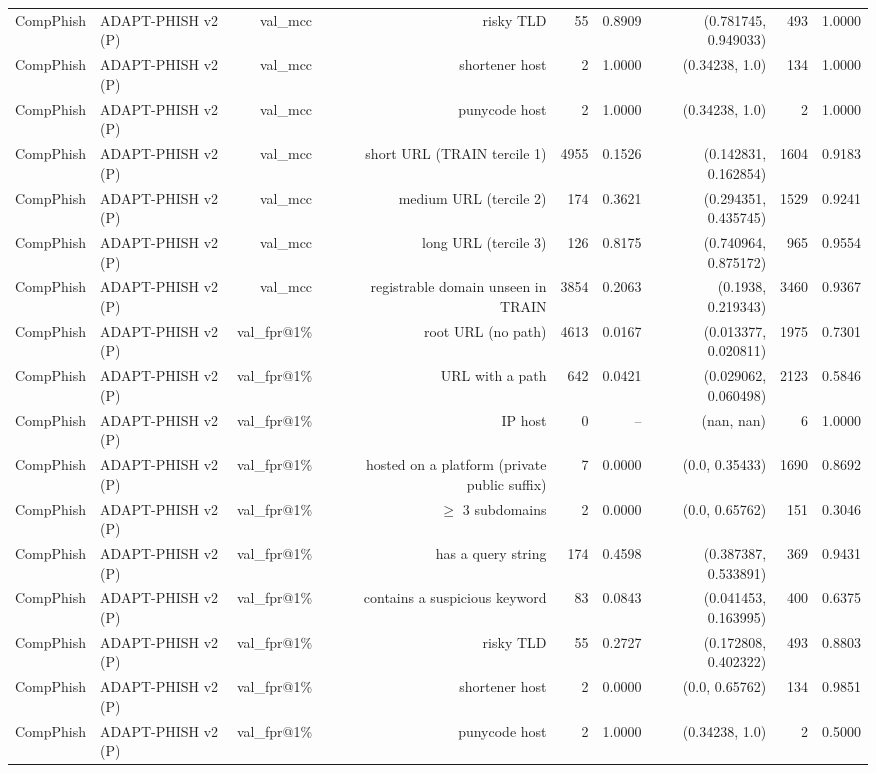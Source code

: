 \begin{table}[t]
\begin{tabular}{llrrrrrrr}
CompPhish & ADAPT-PHISH v2 (P) & val\_mcc & risky TLD & 55 & 0.8909 & (0.781745, 0.949033) & 493 & 1.0000 \\
CompPhish & ADAPT-PHISH v2 (P) & val\_mcc & shortener host & 2 & 1.0000 & (0.34238, 1.0) & 134 & 1.0000 \\
CompPhish & ADAPT-PHISH v2 (P) & val\_mcc & punycode host & 2 & 1.0000 & (0.34238, 1.0) & 2 & 1.0000 \\
CompPhish & ADAPT-PHISH v2 (P) & val\_mcc & short URL (TRAIN tercile 1) & 4955 & 0.1526 & (0.142831, 0.162854) & 1604 & 0.9183 \\
CompPhish & ADAPT-PHISH v2 (P) & val\_mcc & medium URL (tercile 2) & 174 & 0.3621 & (0.294351, 0.435745) & 1529 & 0.9241 \\
CompPhish & ADAPT-PHISH v2 (P) & val\_mcc & long URL (tercile 3) & 126 & 0.8175 & (0.740964, 0.875172) & 965 & 0.9554 \\
CompPhish & ADAPT-PHISH v2 (P) & val\_mcc & registrable domain unseen in TRAIN & 3854 & 0.2063 & (0.1938, 0.219343) & 3460 & 0.9367 \\
CompPhish & ADAPT-PHISH v2 (P) & val\_fpr@1\% & root URL (no path) & 4613 & 0.0167 & (0.013377, 0.020811) & 1975 & 0.7301 \\
CompPhish & ADAPT-PHISH v2 (P) & val\_fpr@1\% & URL with a path & 642 & 0.0421 & (0.029062, 0.060498) & 2123 & 0.5846 \\
CompPhish & ADAPT-PHISH v2 (P) & val\_fpr@1\% & IP host & 0 & -- & (nan, nan) & 6 & 1.0000 \\
CompPhish & ADAPT-PHISH v2 (P) & val\_fpr@1\% & hosted on a platform (private public suffix) & 7 & 0.0000 & (0.0, 0.35433) & 1690 & 0.8692 \\
CompPhish & ADAPT-PHISH v2 (P) & val\_fpr@1\% & $\geq$ 3 subdomains & 2 & 0.0000 & (0.0, 0.65762) & 151 & 0.3046 \\
CompPhish & ADAPT-PHISH v2 (P) & val\_fpr@1\% & has a query string & 174 & 0.4598 & (0.387387, 0.533891) & 369 & 0.9431 \\
CompPhish & ADAPT-PHISH v2 (P) & val\_fpr@1\% & contains a suspicious keyword & 83 & 0.0843 & (0.041453, 0.163995) & 400 & 0.6375 \\
CompPhish & ADAPT-PHISH v2 (P) & val\_fpr@1\% & risky TLD & 55 & 0.2727 & (0.172808, 0.402322) & 493 & 0.8803 \\
CompPhish & ADAPT-PHISH v2 (P) & val\_fpr@1\% & shortener host & 2 & 0.0000 & (0.0, 0.65762) & 134 & 0.9851 \\
CompPhish & ADAPT-PHISH v2 (P) & val\_fpr@1\% & punycode host & 2 & 1.0000 & (0.34238, 1.0) & 2 & 0.5000 \\

\end{tabular}
\end{table}
